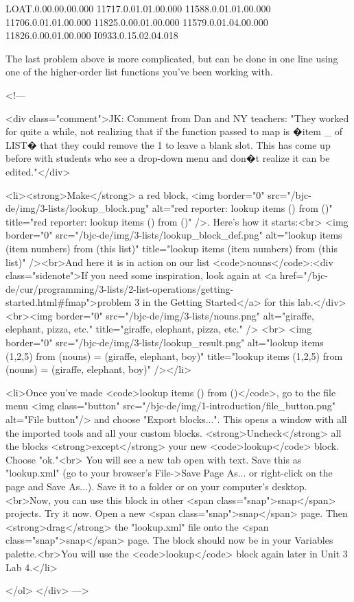 LOAT.0.00.00.00.000
11717.0.01.01.00.000
11588.0.01.01.00.000
11706.0.01.01.00.000
11825.0.00.01.00.000
11579.0.01.04.00.000
11826.0.00.01.00.000
I0933.0.15.02.04.018




The last problem above is more complicated, but can be done in one line using one of the higher-order list functions you've been working with. 





<!---        

<div class="comment">JK: Comment from Dan and NY teachers: "They worked for quite a while, not realizing that if the function passed to map is �item _ of LIST� that they could remove the 1 to leave a blank slot.  This has come up before with students who see a drop-down menu and don�t realize it can be edited."</div>
        
        <li><strong>Make</strong> a red block, <img border="0" src="/bjc-de/img/3-lists/lookup_block.png" alt="red reporter: lookup items () from ()" title="red reporter: lookup items () from ()" />. Here's how it starts:<br> <img border="0" src="/bjc-de/img/3-lists/lookup_block_def.png" alt="lookup items (item numbers) from (this list)" title="lookup items (item numbers) from (this list)" /><br>And here it is in action on our list <code>nouns</code>:<div class="sidenote">If you need some inspiration, look again at <a href="/bjc-de/cur/programming/3-lists/2-list-operations/getting-started.html#fmap">problem 3 in the Getting Started</a> for this lab.</div><br><img border="0" src="/bjc-de/img/3-lists/nouns.png" alt="giraffe, elephant, pizza, etc." title="giraffe, elephant, pizza, etc." /> <br> <img border="0" src="/bjc-de/img/3-lists/lookup_result.png" alt="lookup items (1,2,5) from (nouns) = (giraffe, elephant, boy)" title="lookup items (1,2,5) from (nouns) = (giraffe, elephant, boy)" /></li>
        

 
        
        
        
        
        
        
        
        
                
        <li>Once you've made <code>lookup items () from ()</code>, go to the file menu <img class="button" src="/bjc-de/img/1-introduction/file_button.png" alt="File button"/> and choose "Export blocks...". This opens a window with all the imported tools and all your custom blocks. <strong>Uncheck</strong> all the blocks <strong>except</strong> your new <code>lookup</code> block. Choose "ok."<br> You will see a new tab open with text. Save this as "lookup.xml" (go to your browser's File->Save Page As... or right-click on the page and Save As...). Save it to a folder or on your computer's desktop.<br>Now, you can use this block in other <span class="snap">snap</span> projects. Try it now. Open a new <span class="snap">snap</span> page. Then <strong>drag</strong> the "lookup.xml" file onto the <span class="snap">snap</span> page. The block should now be in your Variables palette.<br>You will use the <code>lookup</code> block again later in Unit 3 Lab 4.</li>
        
    </ol>
    </div>
--->